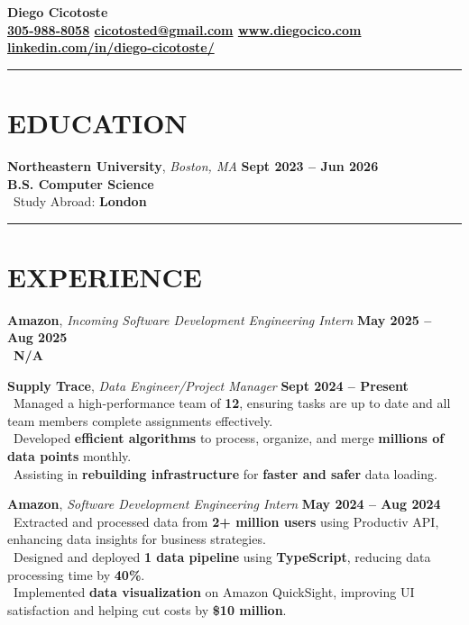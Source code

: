 \documentclass[a4paper,10pt]{article}
\newcommand{\sectionline}{\noindent\rule{\textwidth}{0.6pt}}
\begin{document}
\begin{center}
    {\LARGE \textbf{Diego Cicotoste}}\\
    \textbf{\href{tel:305-988-8058}{305-988-8058} \textbar{} \href{mailto:cicotosted@gmail.com}{cicotosted@gmail.com} \textbar{} \href{https://www.diegocico.com}{www.diegocico.com} \textbar{} \href{https://www.linkedin.com/in/diego-cicotoste/}{linkedin.com/in/diego-cicotoste/}}
\end{center}

\sectionline

\section*{EDUCATION}
\textbf{Northeastern University}, \textit{Boston, MA} \hfill \textbf{Sept 2023 – Jun 2026}\\
\textbf{B.S. Computer Science}\\
\textbullet\ Study Abroad: \textbf{London}

\sectionline

\section*{EXPERIENCE}
\textbf{Amazon}, \textit{Incoming Software Development Engineering Intern} \hfill \textbf{May 2025 – Aug 2025}\\
\textbullet\ \textbf{N/A}

\textbf{Supply Trace}, \textit{Data Engineer/Project Manager} \hfill \textbf{Sept 2024 – Present}\\
\textbullet\ Managed a high-performance team of \textbf{12}, ensuring tasks are up to date and all team members complete assignments effectively.\\
\textbullet\ Developed \textbf{efficient algorithms} to process, organize, and merge \textbf{millions of data points} monthly.\\
\textbullet\ Assisting in \textbf{rebuilding infrastructure} for \textbf{faster and safer} data loading.

\textbf{Amazon}, \textit{Software Development Engineering Intern} \hfill \textbf{May 2024 – Aug 2024}\\
\textbullet\ Extracted and processed data from \textbf{2+ million users} using Productiv API, enhancing data insights for business strategies.\\
\textbullet\ Designed and deployed \textbf{1 data pipeline} using \textbf{TypeScript}, reducing data processing time by \textbf{40\%}.\\
\textbullet\ Implemented \textbf{data visualization} on Amazon QuickSight, improving UI satisfaction and helping cut costs by \textbf{\$10 million}.
\end{document}
